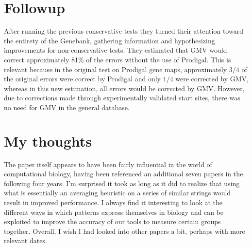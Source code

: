 \documentclass{article}
\begin{document}
\section{Followup}
After running the previous conservative tests they turned their attention toward the entirety of the Genebank, gathering information and hypothesizing improvements for non-conservative tests. They estimated that GMV would correct approximately 81\% of the errors without the use of Prodigal. This is relevant because in the original test on Prodigal gene maps, approximately $3/4$ of the original errors were correct by Prodigal and only $1/4$ were corrected by GMV, whereas in this new estimation, all errors would be corrected by GMV. However, due to corrections made through experimentally validated start sites, there was no need for GMV in the general database.

\section{My thoughts}
The paper itself appears to have been fairly influential in the world of computational biology, having been referenced an additional seven papers in the following four years. I'm surprised it took as long as it did to realize that using what is essentially an averaging heuristic on a series of similar strings would result in improved performance. I always find it interesting to look at the different ways in which patterns express themselves in biology and can be exploited to improve the accuracy of our tools to measure certain groups together. Overall, I wish I had looked into other papers a bit, perhaps with more relevant dates.

\newpage


\end{document}

